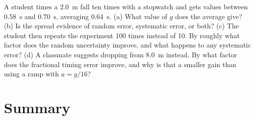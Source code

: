 \documentclass[11pt,twoside,openany]{book}
\newcounter{check}[chapter]
\begin{document}
\begin{checkbox}
A student times a \SI{2.0}{\metre} fall ten times with a stopwatch and gets values between \SI{0.58}{\second} and \SI{0.70}{\second}, averaging \SI{0.64}{\second}. (a) What value of $g$ does the average give? (b) Is the spread evidence of random error, systematic error, or both? (c) The student then repeats the experiment \num{100} times instead of \num{10}. By roughly what factor does the random uncertainty improve, and what happens to any systematic error? (d) A classmate suggests dropping from \SI{8.0}{\metre} instead. By what factor does the fractional timing error improve, and why is that a smaller gain than using a ramp with $a = g/16$?
\end{checkbox}

\section{Summary}
\end{document}
